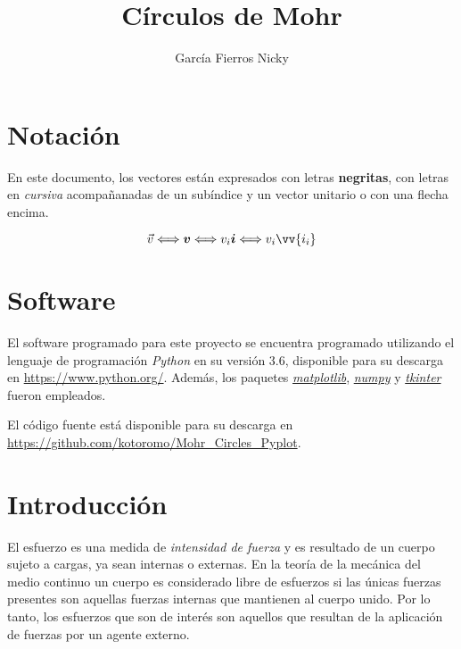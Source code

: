\documentclass{article}
\title{Círculos de Mohr}
\author{García Fierros Nicky}
\begin{document}
    \maketitle
    \newpage
    
    \tableofcontents
    \newpage

    \section*{Notación}

    En este documento, los vectores están expresados con letras \textbf{negritas}, con
    letras en \textit{cursiva} acompañanadas de un subíndice y un vector unitario o con
    una flecha encima.

    \begin{equation*}
        \vec{v} \Longleftrightarrow \bm{v} \Longleftrightarrow v_{i}\bm{i} \Longleftrightarrow v_{i}\vv{i_{i}}
    \end{equation*}

    \section*{Software}

    El software programado para este proyecto se encuentra programado utilizando el lenguaje de programaci\'{o}n
    \textit{Python} en su versi\'{o}n 3.6, disponible para su descarga en \url{https://www.python.org/}. Adem\'{a}s,
    los paquetes \href{https://matplotlib.org/#}{\textit{matplotlib}}, \href{http://www.numpy.org/}{\textit{numpy}} y 
    \href{https://wiki.python.org/moin/TkInter}{\textit{tkinter}} fueron empleados.

    El c\'{o}digo fuente est\'{a} disponible para su descarga en \url{https://github.com/kotoromo/Mohr_Circles_Pyplot}.

    \newpage

    \section{Introducción}

    El esfuerzo es una medida de \textit{intensidad de fuerza} y es resultado de un 
    cuerpo sujeto a cargas, ya sean internas o externas. En la teoría de la mecánica
    del medio continuo un cuerpo es considerado libre de esfuerzos si las únicas
    fuerzas presentes son aquellas fuerzas internas que mantienen al cuerpo unido.
    Por lo tanto, los esfuerzos que son de interés son aquellos que resultan de la
    aplicación de fuerzas por un agente externo.\\
\end{document}

